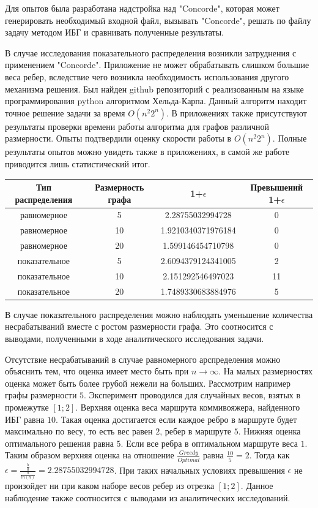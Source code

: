 \documentclass[a4paper, 14pt]{extarticle}
\begin{document}
Для опытов была разработана надстройка над "Concorde", которая может генерировать необходимый входной файл, вызывать "Concorde", решать по файлу задачу методом ИБГ и сравнивать полученные результаты.

В случае исследования показательного распределения возникли затруднения с применением "Concorde". Приложение не может обрабатывать слишком большие веса ребер, вследствие чего возникла необходимость использования другого механизма решения. Был найден github репозиторий с реализованным на языке программирования python алгоритмом Хельда-Карпа. Данный алгоритм находит точное решение задачи за время $O(n^2 2^n)$. В приложениях также присутствуют результаты проверки времени работы алгоритма для графов различной размерности. Опыты подтвердили оценку скорости работы в $O(n^2 2^n)$. Полные результаты опытов можно увидеть также в приложениях, в самой же работе приводится лишь статистический итог.

\begin{center}
 \begin{tabular}{||c c c c||} 
 \hline
 Тип распределения & Размерность графа  & 1+$\epsilon$  & Превышений 1+$\epsilon$ \\ [0.5ex] 
 \hline\hline
 равномерное & 5 & 2.28755032994728 & 0 \\ 
 \hline
 равномерное & 10 & 1.9210340371976184 & 0 \\
 \hline
 равномерное & 20 & 1.599146454710798 & 0 \\
 \hline
 показательное & 5 & 2.6094379124341005 & 2 \\
 \hline
 показательное & 10 & 2.151292546497023 & 11 \\
 \hline
 показательное & 20 & 1.7489330683884976 & 5 \\ [1ex] 
 \hline
\end{tabular}
\end{center}

В случае показательного распределения можно наблюдать уменьшение количества несрабатываний вместе с ростом размерности графа. Это соотносится с выводами, полученными в ходе аналитического исследования задачи. 

Отсутствие несрабатываний в случае равномерного арспределения можно объяснить тем, что оценка имеет место быть при $n \rightarrow \infty$. На малых размерностях оценка может быть более грубой нежели на больших. Рассмотрим например графы размерности $5$. Эксперимент проводился для случайных весов, взятых в промежутке $[1;2]$. Верхняя оценка веса маршрута коммивояжера, найденного ИБГ равна $10$. Такая оценка достигается если каждое ребро в маршруте будет максимально по весу, то есть вес равен $2$, ребер в маршруте $5$. Нижняя оценка оптимального решения равна $5$. Если все ребра в оптимальном маршруте веса $1$. Таким образом верхняя оценка на отношение $\frac{Greedy}{Optimal}$ равна $\frac{10}{5} = 2$. Тогда как $\epsilon = \frac{\frac{b}{a}}{\frac{n}{ln(n)}} = 2.28755032994728$. При таких начальных условиях превышения $\epsilon$ не произойдет ни при каком наборе весов ребер из отрезка $[1;2]$. Данное наблюдение также соотносится с выводами из аналитических исследований.
\end{document}

